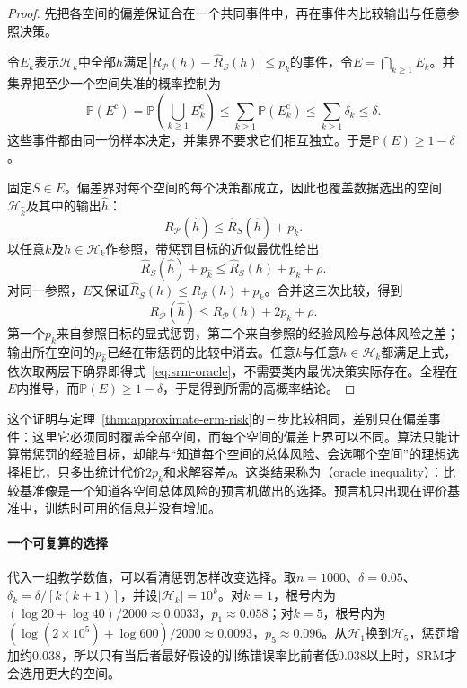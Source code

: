 \begin{proof}
先把各空间的偏差保证合在一个共同事件中，再在事件内比较输出与任意参照决策。

令$E_k$表示$\mathcal H_k$中全部$h$满足$|R_{\mathcal P}(h)-\hat R_S(h)|\leq p_k$的事件，令$E=\bigcap_{k\geq1}E_k$。并集界把至少一个空间失准的概率控制为
\[
 \mathbb P(E^{\mathrm c})
 =\mathbb P\left(\bigcup_{k\geq1}E_k^{\mathrm c}\right)
 \leq\sum_{k\geq1}\mathbb P(E_k^{\mathrm c})
 \leq\sum_{k\geq1}\delta_k\leq\delta.
\]
这些事件都由同一份样本决定，并集界不要求它们相互独立。于是$\mathbb P(E)\geq1-\delta$。

固定$S\in E$。偏差界对每个空间的每个决策都成立，因此也覆盖数据选出的空间$\mathcal H_{\hat k}$及其中的输出$\hat h$：
\[
 R_{\mathcal P}(\hat h)\leq\hat R_S(\hat h)+p_{\hat k}.
\]
以任意$k$及$h\in\mathcal H_k$作参照，带惩罚目标的近似最优性给出
\[
 \hat R_S(\hat h)+p_{\hat k}
 \leq\hat R_S(h)+p_k+\rho.
\]
对同一参照，$E$又保证$\hat R_S(h)\leq R_{\mathcal P}(h)+p_k$。合并这三次比较，得到
\[
 R_{\mathcal P}(\hat h)
 \leq R_{\mathcal P}(h)+2p_k+\rho.
\]
第一个$p_k$来自参照目标的显式惩罚，第二个来自参照的经验风险与总体风险之差；输出所在空间的$p_{\hat k}$已经在带惩罚的比较中消去。任意$k$与任意$h\in\mathcal H_k$都满足上式，依次取两层下确界即得式~\eqref{eq:srm-oracle}，不需要类内最优决策实际存在。全程在$E$内推导，而$\mathbb P(E)\geq1-\delta$，于是得到所需的高概率结论。
\end{proof}

这个证明与定理~\ref{thm:approximate-erm-risk}的三步比较相同，差别只在偏差事件：这里它必须同时覆盖全部空间，而每个空间的偏差上界可以不同。算法只能计算带惩罚的经验目标，却能与“知道每个空间的总体风险、会选哪个空间”的理想选择相比，只多出统计代价$2p_k$和求解容差$\rho$。这类结果称为（oracle inequality）：比较基准像是一个知道各空间总体风险的预言机做出的选择。预言机只出现在评价基准中，训练时可用的信息并没有增加。

\paragraph{一个可复算的选择}

代入一组教学数值，可以看清惩罚怎样改变选择。取$n=1000$、$\delta=0.05$、$\delta_k=\delta/[k(k+1)]$，并设$|\mathcal H_k|=10^k$。对$k=1$，根号内为$(\log20+\log40)/2000\approx0.0033$，$p_1\approx0.058$；对$k=5$，根号内为$(\log(2\times10^5)+\log600)/2000\approx0.0093$，$p_5\approx0.096$。从$\mathcal H_1$换到$\mathcal H_5$，惩罚增加约0.038，所以只有当后者最好假设的训练错误率比前者低0.038以上时，SRM才会选用更大的空间。

